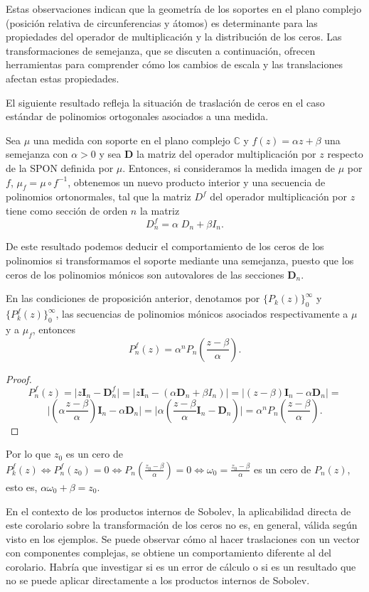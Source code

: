 Estas observaciones indican que la geometría de los soportes en el plano complejo (posición relativa de circunferencias y átomos) es determinante para las propiedades del operador de multiplicación y la distribución de los ceros. Las transformaciones de semejanza, que se discuten a continuación, ofrecen herramientas para comprender cómo los cambios de escala y las translaciones afectan estas propiedades.

El siguiente resultado refleja la situación de traslación de ceros en el caso estándar de polinomios ortogonales asociados a una medida.

\begin{proposition}
  \cite{Escribano2012} Sea $\mu $ una medida con soporte en el plano complejo $\mathbb{C} $ y  $f(z)=\alpha z+\beta $ una semejanza con $\alpha > 0
  $   y sea $\mathbf{D}$ la matriz del operador  multiplicación por $z$ respecto de la SPON definida por $\mu $. Entonces, si consideramos la medida imagen de $\mu $ por $f$, $\mu_{f}=\mu \circ f^{-1}$, obtenemos un nuevo producto interior y una secuencia de polinomios ortonormales, tal que la matriz $D^{f}$ del operador multiplicación por $z$ tiene como sección de orden $n$ la matriz
  \[
    D^{f}_{n} = \alpha\;  D_{n} + \beta I_{n}.
  \]

\end{proposition}
De este resultado podemos deducir el comportamiento de los ceros de los polinomios si transformamos el soporte mediante una semejanza, puesto que  los ceros de los polinomios mónicos  son  autovalores de las secciones $\mathbf{D}_n$.
\begin{corollary}
  En las condiciones de  proposición anterior,
  denotamos por $\{P_{k}(z)\}_{0}^{\infty}$ y $\{P_{k}^{f}(z)\}_{0}^{\infty}$, las secuencias de polinomios mónicos asociados respectivamente a $\mu$ y a $\mu_f$, entonces
  \[
    P_{n}^{f}(z)=\alpha^n P_{n}(\frac{z-\beta}{\alpha}).
  \]
\end{corollary}

\begin{proof}
  \[
    P_{n}^{f}(z)= \vert z \mathbf{I}_{n}-\mathbf{D}^f_{n} \vert =\vert z \mathbf{I}_{n}-(\alpha \mathbf{D}_{n} + \beta I_{n})\vert =
    \vert( z-\beta)\mathbf{I}_{n}-\alpha \mathbf{D}_{n} \vert=
  \]
  \[
    \vert(\alpha\frac{z-\beta}{\alpha} )\mathbf{I}_{n}-\alpha \mathbf{D}_{n} \vert=\vert\alpha(\frac{z-\beta}{\alpha} \mathbf{I}_{n}-\mathbf{D}_{n}) \vert=
    \alpha^n P_{n}(\frac{z-\beta}{\alpha}).
  \]
\end{proof}
Por lo que  $z_0$ es un cero de $P_{k}^{f}(z)\Leftrightarrow P_{n}^{f}(z_0)=0 \Leftrightarrow P_{n}(\frac{z_0-\beta}{\alpha})=0\Leftrightarrow \omega_0=\frac{z_0-\beta}{\alpha}$ es un cero de $P_{n}(z)$, esto es, $\alpha \omega_0+\beta=z_0$.

En el contexto de los productos internos de Sobolev, la aplicabilidad directa de este corolario sobre la transformación de los ceros no es, en general, válida según visto en los ejemplos. Se puede observar cómo al hacer traslaciones con un vector con componentes complejas, se obtiene un comportamiento diferente al del corolario. Habría que investigar si es un error de cálculo o si es un resultado que no se puede aplicar directamente a los productos internos de Sobolev.